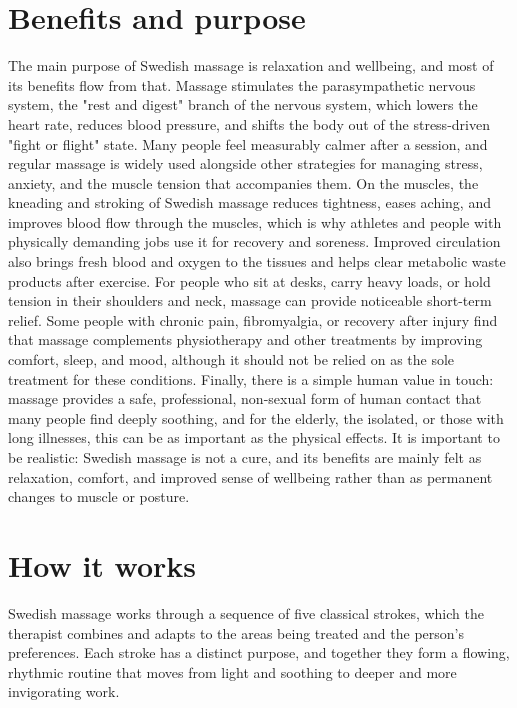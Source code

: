 \section*{Benefits and purpose}
The main purpose of Swedish massage is relaxation and wellbeing, and most of its benefits flow from that. Massage stimulates the parasympathetic nervous system, the "rest and digest" branch of the nervous system, which lowers the heart rate, reduces blood pressure, and shifts the body out of the stress-driven "fight or flight" state. Many people feel measurably calmer after a session, and regular massage is widely used alongside other strategies for managing stress, anxiety, and the muscle tension that accompanies them. On the muscles, the kneading and stroking of Swedish massage reduces tightness, eases aching, and improves blood flow through the muscles, which is why athletes and people with physically demanding jobs use it for recovery and soreness. Improved circulation also brings fresh blood and oxygen to the tissues and helps clear metabolic waste products after exercise. For people who sit at desks, carry heavy loads, or hold tension in their shoulders and neck, massage can provide noticeable short-term relief. Some people with chronic pain, fibromyalgia, or recovery after injury find that massage complements physiotherapy and other treatments by improving comfort, sleep, and mood, although it should not be relied on as the sole treatment for these conditions. Finally, there is a simple human value in touch: massage provides a safe, professional, non-sexual form of human contact that many people find deeply soothing, and for the elderly, the isolated, or those with long illnesses, this can be as important as the physical effects. It is important to be realistic: Swedish massage is not a cure, and its benefits are mainly felt as relaxation, comfort, and improved sense of wellbeing rather than as permanent changes to muscle or posture.

\section*{How it works}
Swedish massage works through a sequence of five classical strokes, which the therapist combines and adapts to the areas being treated and the person's preferences. Each stroke has a distinct purpose, and together they form a flowing, rhythmic routine that moves from light and soothing to deeper and more invigorating work.

